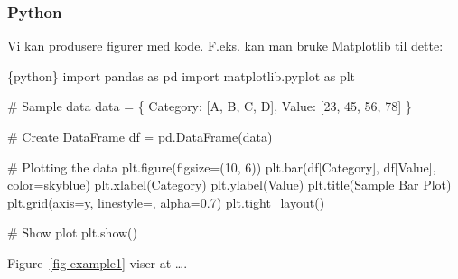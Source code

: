 \documentclass[
  10pt,
]{scrartcl}
\newenvironment{Shaded}{\begin{snugshade}}{\end{snugshade}}
\newcommand{\InformationTok}[1]{\textcolor[rgb]{0.37,0.37,0.37}{#1}}
\begin{document}
\subsubsection{Python}\label{python}

Vi kan produsere figurer med kode. F.eks. kan man bruke Matplotlib til
dette:

\begin{Shaded}
\begin{Highlighting}[]
\InformationTok{\textasciigrave{}\textasciigrave{}\textasciigrave{}\{python\}}
\InformationTok{import pandas as pd}
\InformationTok{import matplotlib.pyplot as plt}

\InformationTok{\# Sample data}
\InformationTok{data = \{}
\InformationTok{    \textquotesingle{}Category\textquotesingle{}: [\textquotesingle{}A\textquotesingle{}, \textquotesingle{}B\textquotesingle{}, \textquotesingle{}C\textquotesingle{}, \textquotesingle{}D\textquotesingle{}],}
\InformationTok{    \textquotesingle{}Value\textquotesingle{}: [23, 45, 56, 78]}
\InformationTok{\}}

\InformationTok{\# Create DataFrame}
\InformationTok{df = pd.DataFrame(data)}

\InformationTok{\# Plotting the data}
\InformationTok{plt.figure(figsize=(10, 6))}
\InformationTok{plt.bar(df[\textquotesingle{}Category\textquotesingle{}], df[\textquotesingle{}Value\textquotesingle{}], color=\textquotesingle{}skyblue\textquotesingle{})}
\InformationTok{plt.xlabel(\textquotesingle{}Category\textquotesingle{})}
\InformationTok{plt.ylabel(\textquotesingle{}Value\textquotesingle{})}
\InformationTok{plt.title(\textquotesingle{}Sample Bar Plot\textquotesingle{})}
\InformationTok{plt.grid(axis=\textquotesingle{}y\textquotesingle{}, linestyle=\textquotesingle{}{-}{-}\textquotesingle{}, alpha=0.7)}
\InformationTok{plt.tight\_layout()}

\InformationTok{\# Show plot}
\InformationTok{plt.show()}
\InformationTok{\textasciigrave{}\textasciigrave{}\textasciigrave{}}
\end{Highlighting}
\end{Shaded}

Figure~\ref{fig-example1} viser at \ldots.
\end{document}
